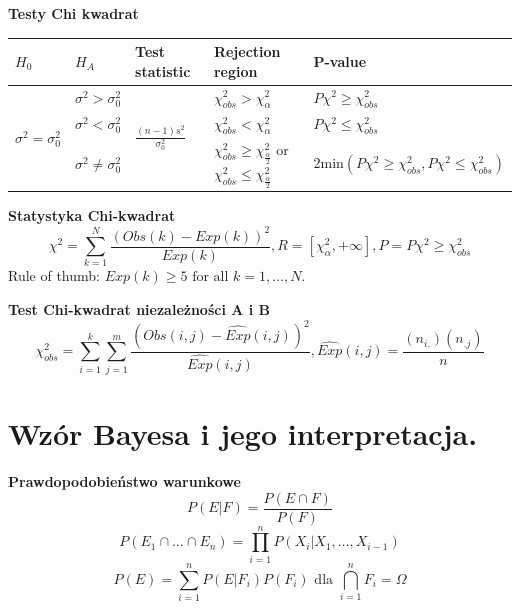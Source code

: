 \documentclass[12pt]{article}
\begin{document}
    \textbf{Testy Chi kwadrat}
    \begin{table}[H]
        \begin{center}
            \begin{tabular}{ p{} |p{} |p{} |p{} | p{}}
                \toprule
                $H_0$ &  $H_A$ & Test statistic & Rejection region & P-value \\
                \toprule
                \multirow{3}{*}{$\sigma^2 = \sigma_0^2$} & $\sigma^2 > \sigma_0^2$
                & \multirow{3}{*}{$\frac{(n-1)s^2}{\sigma_0^2}$} & $\chi_{obs}^2 > \chi_{\alpha}^2$ & $P{\chi^2 \geq \chi_{obs}^2}$\\
                & $\sigma^2 < \sigma_0^2$ & & $\chi_{obs}^2 < \chi_{\alpha}^2$ & $P{\chi^2 \leq \chi_{obs}^2}$\\
                & $\sigma^2 \neq \sigma_0^2$ & & $\chi_{obs}^2 \geq \chi_{\frac{\alpha}{2}}^2$
                or $\chi_{obs}^2 \leq \chi_{\frac{\alpha}{2}}^2$
                & $2\text{min}(P{\chi^2 \geq \chi_{obs}^2}, P{\chi^2 \leq \chi_{obs}^2})$\\
                \bottomrule
            \end{tabular}
        \end{center}
    \end{table}

    \textbf{Statystyka Chi-kwadrat}
    \begin{equation*}
        \chi^2 = \sum_{k=1}^{N} \frac{(Obs(k) - Exp(k))^2}{Exp(k)}, R = [\chi_{\alpha}^2, +\infty], P = P{\chi^2 \geq \chi_{obs}^2}
    \end{equation*}
    Rule of thumb: $Exp(k) \geq 5 \text{ for all }k = 1, \dots, N$.

    \textbf{Test Chi-kwadrat niezależności A i B}
    \begin{equation*}
        \chi_{obs}^2 = \sum_{i=1}^k \sum_{j=1}^m \frac{(Obs(i,j) - \hat{Exp}(i,j))^2}{\hat{Exp}(i,j)}, \hat{Exp}(i,j) = \frac{(n_{i.})(n_{.j})}{n}
    \end{equation*}

    \newpage

    \section{Wzór Bayesa i jego interpretacja.}

    \textbf{Prawdopodobieństwo warunkowe}
    \begin{equation}
        P(E|F) = \frac{P(E \cap F)}{P(F)}
    \end{equation}
    \begin{equation}
        P(E_1 \cap \dots \cap E_n) = \prod_{i=1}^{n} P(X_i | X_1, \dots, X_{i-1})
    \end{equation}
    \begin{equation}
        P(E) = \sum_{i=1}^{n} P(E|F_i)P(F_i) \text{ dla } \bigcap_{i=1}^{n} F_i = \Omega
    \end{equation}
\end{document}
